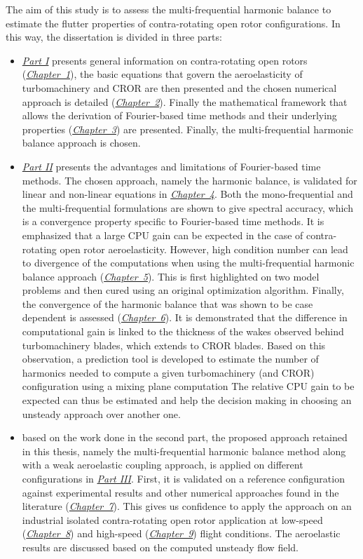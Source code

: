 The aim of this study is to assess the
multi-frequential harmonic balance
to estimate the flutter properties of contra-rotating open rotor
configurations. In this way, the dissertation is divided in three parts:
\begin{itemize}
	\item \hyperref[part1]{\emph{Part I}} presents general information on 
	contra-rotating open rotors (\hyperref[cha:cror]{\emph{Chapter~1}}),
	the basic equations that govern the aeroelasticity of
	turbomachinery and CROR are then presented and the 
	chosen numerical approach 
	is detailed (\hyperref[cha:ael]{\emph{Chapter~2}}).
	Finally the mathematical framework that allows the derivation
	of Fourier-based time methods and their underlying properties
	(\hyperref[cha:spectral_methods]{\emph{Chapter~3}}) are presented.
	Finally, the multi-frequential harmonic balance approach is chosen.
	\item \hyperref[part2]{\emph{Part II}} 
	presents the advantages and limitations
	of Fourier-based time methods. The chosen approach, namely
	the harmonic balance, is validated for linear and non-linear
	equations in \hyperref[cha:validation_hb]{\emph{Chapter~4}}. Both the
	mono-frequential and the multi-frequential formulations
	are shown to give spectral accuracy, which is a convergence
	property specific to Fourier-based time methods.
	It is emphasized
	that a large CPU gain can be expected in the
	case of contra-rotating open rotor aeroelasticity. 
	However, high condition number can lead to divergence
	of the computations when using the multi-frequential harmonic
	balance approach
	(\hyperref[cha:limitations_condition_number]{\emph{Chapter~5}}). This is 
	first highlighted on two model problems and then cured using
	an original optimization algorithm.
	Finally, the convergence of the harmonic balance 
	that was shown to be case dependent is
	assessed (\hyperref[cha:limitations_convergence]{\emph{Chapter~6}}). 
	It is demonstrated that the difference in computational
	gain is linked to the thickness of the wakes observed behind
	turbomachinery blades, which extends to CROR blades. Based on this observation,
	a prediction tool is developed to estimate the
	number of harmonics needed to compute a given turbomachinery (and CROR)
	configuration using a mixing plane computation 
	The relative CPU gain to be expected can thus be estimated
	and help the decision making in choosing an unsteady approach
	over another one.
	\item based on the work done in the second part,
	the proposed approach retained in this thesis, 
	namely the multi-frequential harmonic balance method along with a weak 
	aeroelastic coupling approach, is applied on different configurations
	in \hyperref[part3]{\emph{Part III}}. First, it is validated 
	on a reference configuration against experimental 
	results and other numerical approaches found in the literature
	(\hyperref[cha:stcf11]{\emph{Chapter~7}}). This gives us confidence
	to apply the approach on an industrial isolated contra-rotating
	open rotor application at low-speed (\hyperref[cha:dream_ls_isolated]{\emph{Chapter~8}})
	and high-speed (\hyperref[cha:dream_hs_isolated]{\emph{Chapter~9}})
	flight conditions. The aeroelastic results are discussed based
	on the computed unsteady flow field.
\end{itemize}

